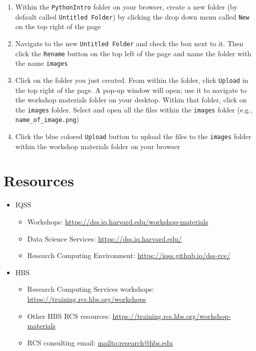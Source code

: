 \documentclass[
]{book}
\providecommand{\tightlist}{%
  \setlength{\itemsep}{0pt}\setlength{\parskip}{0pt}}
\begin{document}
\begin{enumerate}
\def\labelenumi{\arabic{enumi}.}
\setcounter{enumi}{6}
\tightlist
\item
  Within the \texttt{PythonIntro} folder on your browser, create a new folder (by default called \texttt{Untitled\ Folder}) by clicking the drop down menu called \texttt{New} on the top right of the page
\item
  Navigate to the new \texttt{Untitled\ Folder} and check the box next to it. Then click the \texttt{Rename} button on the top left of the page and name the folder with the name \texttt{images}
\item
  Click on the folder you just created. From within the folder, click \texttt{Upload} in the top right of the page. A pop-up window will open; use it to navigate to the workshop materials folder on your desktop. Within that folder, click on the \texttt{images} folder. Select and open all the files within the \texttt{images} folder (e.g., \texttt{name\_of\_image.png})
\item
  Click the blue colored \texttt{Upload} button to upload the files to the \texttt{images} folder within the workshop materials folder on your browser
\end{enumerate}

\hypertarget{resources-6}{%
\section{Resources}\label{resources-6}}

\begin{itemize}
\tightlist
\item
  IQSS

  \begin{itemize}
  \tightlist
  \item
    Workshops: \url{https://dss.iq.harvard.edu/workshop-materials}
  \item
    Data Science Services: \url{https://dss.iq.harvard.edu/}
  \item
    Research Computing Environment: \url{https://iqss.github.io/dss-rce/}
  \end{itemize}
\item
  HBS

  \begin{itemize}
  \tightlist
  \item
    Research Computing Services workshops: \url{https://training.rcs.hbs.org/workshops}
  \item
    Other HBS RCS resources: \url{https://training.rcs.hbs.org/workshop-materials}
  \item
    RCS consulting email: \url{mailto:research@hbs.edu}
  \end{itemize}
\end{itemize}
\end{document}
